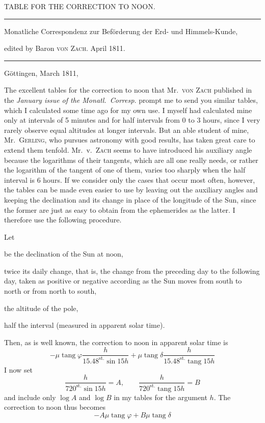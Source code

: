 \clearpage{}%
\begin{center}
{\small TABLE FOR THE CORRECTION TO NOON.\par}
\medskip\hrule\medskip
{\small Monatliche Correspondenz zur Beförderung der Erd- und Himmels-Kunde,\par
edited by Baron \textsc{von Zach}. April 1811.\par}
\medskip\hrule
\end{center}\medskip
\begin{flushright}Göttingen, March 1811,\end{flushright}
The excellent tables for the correction to noon that Mr.~\textsc{von Zach} published in the \emph{January issue of the Monatl.\ Corresp.} prompt me to send you similar tables, which I calculated some time ago for my own use. I myself had calculated mine only at intervals of 5 minutes and for half intervals from 0 to 3 hours, since I very rarely observe equal altitudes at longer intervals. But an able student of mine, Mr.~\textsc{Gerling}, who pursues astronomy with good results, has taken great care to extend them tenfold. Mr.~v.~\textsc{Zach} seems to have introduced his auxiliary angle because the logarithms of their tangents, which are all one really needs, or rather the logarithm of the tangent of one of them, varies too sharply when the half interval is 6 hours. If we consider only the cases that occur most often, however, the tables can be made even easier to use by leaving out the auxiliary angles and keeping the declination and its change in place of the longitude of the Sun, since the former are just as easy to obtain from the ephemerides as the latter. I therefore use the following procedure.
%

Let
\begin{list}{}{\setlength{\leftmargin}{1.8em}\setlength{\labelwidth}{1.2em}\setlength{\labelsep}{.6em}\setlength{\itemsep}{0pt}\setlength{\parsep}{0pt}}
\item[$\delta$] be the declination of the Sun at noon,
\item[$\mu$] twice its daily change, that is, the change from the preceding day to the following day, taken as positive or negative according as the Sun moves from south to north or from north to south,
\item[$\varphi$] the altitude of the pole,
\item[$h$] half the interval (measured in apparent solar time).
\end{list}
Then, as is well known, the correction to noon in apparent solar time is
\[
-\mu\operatorname{tang}\varphi\frac h{15.48^{\mathrm{st.}}\sin15h}+\mu\operatorname{tang}\delta\frac h{15.48^{\mathrm{st.}}\operatorname{tang}15h}
\]
I now set
\[
\frac h{720^{\mathrm{st.}}\sin15h}=A,\qquad\frac h{720^{\mathrm{st.}}\operatorname{tang}15h}=B
\]
and include only $\log A$ and $\log B$ in my tables for the argument $h$. The correction to noon thus becomes
\[
-A\mu\operatorname{tang}\varphi+B\mu\operatorname{tang}\delta
\]

